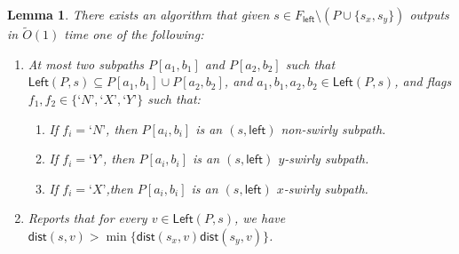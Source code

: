 \documentclass{article}
\newcommand{\Left}{\mathsf{Left}}
\newcommand{\leftside}{\mathsf{left}}
\newcommand{\dist}{\mathsf{dist}}
\newtheorem{lemma}{Lemma}
\newcommand{\Otild}{\tilde{O}}
\begin{document}
\begin{lemma}\label{lem:Partition-P-for-one-site}
    There exists an algorithm that given $s\in F_{\leftside}\setminus (P\cup\{s_x,s_y\})$ outputs in $\Otild(1)$ time one of the following:
    \begin{enumerate}
        \item At most two subpaths $P[a_1,b_1]$ and $P[a_2,b_2]$ such that $\Left(P,s)\subseteq P[a_1,b_1] \cup P[a_2,b_2]$, and $a_1,b_1,a_2,b_2\in\Left(P,s)$, and flags $f_1,f_2 \in \{‘N’,‘X’,‘Y’\} $ such that:
        \begin{enumerate}
        \item If $f_i=‘N’$, then $P[a_i,b_i]$ is an $(s,\leftside)$ non-swirly subpath.
        \item If $f_i=‘Y’$, then $P[a_i,b_i]$ is an $(s,\leftside)$ $y$-swirly subpath.
        \item If $f_i=‘X’$,then $P[a_i,b_i]$ is an $(s,\leftside)$ $x$-swirly subpath.
    \end{enumerate}
        \item Reports that for every $v\in \Left(P,s)$, we have $\dist(s,v)>\min\{\dist(s_x,v)\dist(s_y,v)\}$.
    \end{enumerate}
\end{lemma}
\end{document}
